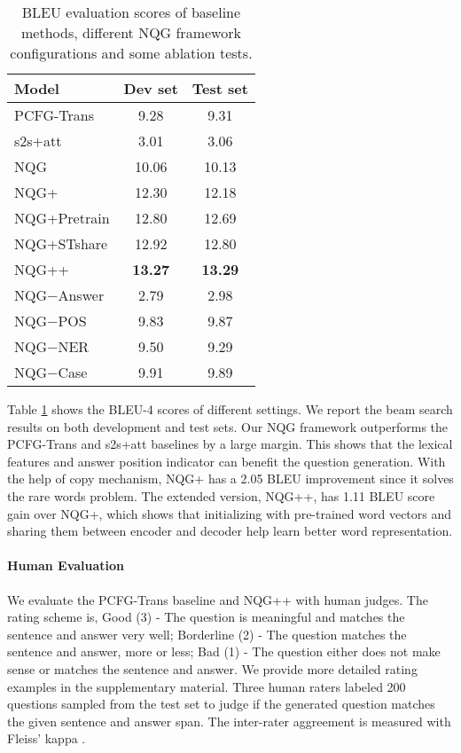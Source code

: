 \documentclass[11pt,letterpaper]{article}
\newcommand{\ourModelName}{NQG}
\begin{document}
\begin{table}[htbp]
		\small
	\begin{center}
		\begin{tabular}{lcc}
			\toprule
			\textbf{Model} &  Dev set & Test set  \\
			\midrule
			PCFG-Trans & 9.28 & 9.31 \\
			s2s+att & 3.01 & 3.06  \\
			\hline
			\hline
			\ourModelName{} & 10.06  & 10.13  \\
			\ourModelName{}+ & 12.30  & 12.18 \\
			\ourModelName{}+Pretrain & 12.80  & 12.69  \\
			\ourModelName{}+STshare & 12.92  &  12.80 \\
			\ourModelName{}++ & \textbf{13.27} & \textbf{13.29} \\
			\hline
			\hline
			\ourModelName{}$ - $Answer &  2.79 &  2.98  \\
			\ourModelName{}$ - $POS & 9.83  & 9.87 \\
			\ourModelName{}$ - $NER & 9.50 & 9.29 \\
			\ourModelName{}$ - $Case & 9.91  & 9.89 \\
			\bottomrule
		\end{tabular}
	\end{center}
	\caption{\label{tbl:bleu} BLEU evaluation scores of baseline methods, different \ourModelName{} framework configurations and some ablation tests.}
\end{table}

Table \ref{tbl:bleu} shows the BLEU-4 scores of different settings.
We report the beam search results on both development and test sets.
Our \ourModelName{} framework outperforms the PCFG-Trans and s2s+att baselines by a large margin.
This shows that the lexical features and answer position indicator can benefit the question generation.
With the help of copy mechanism, \ourModelName{}+ has a 2.05 BLEU improvement since it solves the rare words problem.
The extended version, \ourModelName{}++, has 1.11 BLEU score gain over \ourModelName{}+, which shows that initializing with pre-trained word vectors and sharing them between encoder and decoder help learn better word representation.

\paragraph{Human Evaluation}
We  evaluate the PCFG-Trans baseline and \ourModelName{}++ with human judges.
The rating scheme is, Good (3) - The question is meaningful and matches the sentence and answer very well;
Borderline (2) - The question matches the sentence and answer, more or less;
Bad (1) - The question either does not make sense or matches the sentence and answer.
We provide more detailed rating examples in the supplementary material.
Three human raters labeled 200 questions sampled from the test set to judge if the generated question matches the given sentence and answer span.
The inter-rater aggreement is measured with Fleiss' kappa \cite{fleiss1971measuring}.
\end{document}
